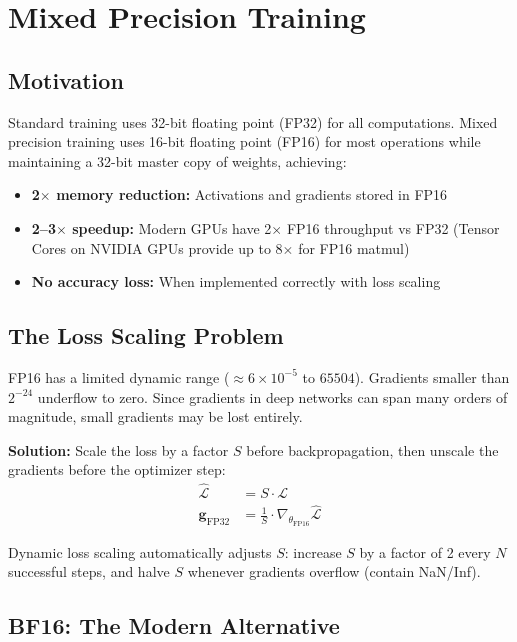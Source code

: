 \section{Mixed Precision Training}

\subsection{Motivation}

Standard training uses 32-bit floating point (FP32) for all computations. Mixed precision training uses 16-bit floating point (FP16) for most operations while maintaining a 32-bit master copy of weights, achieving:
\begin{itemize}
    \item \textbf{2$\times$ memory reduction:} Activations and gradients stored in FP16
    \item \textbf{2--3$\times$ speedup:} Modern GPUs have 2$\times$ FP16 throughput vs FP32 (Tensor Cores on NVIDIA GPUs provide up to 8$\times$ for FP16 matmul)
    \item \textbf{No accuracy loss:} When implemented correctly with loss scaling
\end{itemize}

\subsection{The Loss Scaling Problem}

FP16 has a limited dynamic range ($\approx 6 \times 10^{-5}$ to $65504$). Gradients smaller than $2^{-24}$ underflow to zero. Since gradients in deep networks can span many orders of magnitude, small gradients may be lost entirely.

\textbf{Solution:} Scale the loss by a factor $S$ before backpropagation, then unscale the gradients before the optimizer step:
\begin{align}
\hat{\mathcal{L}} &= S \cdot \mathcal{L} \\
\mathbf{g}_{\text{FP32}} &= \frac{1}{S} \cdot \nabla_{\theta_{\text{FP16}}} \hat{\mathcal{L}}
\end{align}

Dynamic loss scaling \cite{micikevicius2018mixed} automatically adjusts $S$: increase $S$ by a factor of 2 every $N$ successful steps, and halve $S$ whenever gradients overflow (contain NaN/Inf).

\subsection{BF16: The Modern Alternative}

